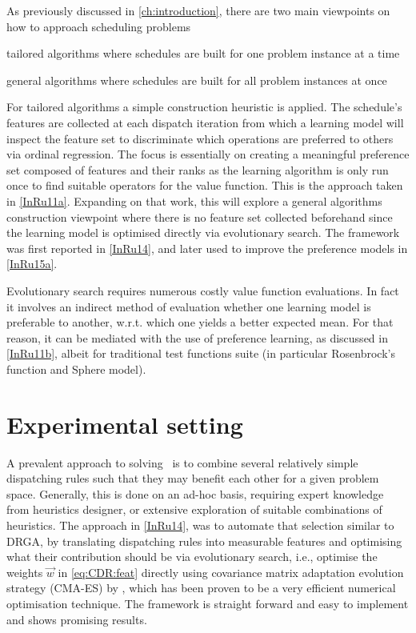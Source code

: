 As previously discussed in \cref{ch:introduction}, there are two main 
viewpoints on how to approach scheduling problems
\begin{enumerate*}
    \item tailored algorithms where schedules are built for one problem 
    instance at a time
    \item general algorithms where schedules are built for all problem 
    instances at once
\end{enumerate*}
For tailored algorithms a simple construction heuristic is applied. The 
schedule's features are collected at each dispatch iteration from which a 
learning model will inspect the feature set to discriminate which operations 
are preferred to others via ordinal regression. The focus is essentially on 
creating a meaningful preference set composed of features and their ranks as 
the learning algorithm is only run once to find suitable operators for the 
value function. This is the approach taken in \cref{InRu11a}. Expanding on 
that  work, this  will explore a general algorithms 
construction viewpoint where there is no feature set collected beforehand since 
the learning model is optimised directly via evolutionary search. The framework 
was first reported in \cref{InRu14}, and later used to improve the preference 
models in \cref{InRu15a}. 

Evolutionary search requires numerous costly value function evaluations. 
In fact it involves an indirect method of evaluation whether one learning model 
is preferable to another, w.r.t. which one yields a better expected mean. For 
that reason, it can be mediated with the use of preference learning, as 
discussed in \cref{InRu11b}, albeit for traditional test functions suite (in 
particular Rosenbrock's function and Sphere model).

\section{Experimental setting}
A prevalent approach to solving \JSP\ is to combine several relatively simple 
dispatching rules such that they may benefit each other for a given problem 
space. Generally, this is done on an ad-hoc basis, requiring expert knowledge 
from heuristics designer, or extensive exploration of suitable combinations of 
heuristics. The approach in \cref{InRu14}, was to automate that selection 
similar to DRGA, by translating dispatching rules into measurable features and 
optimising what their contribution should be via evolutionary search, i.e., 
optimise the weights $\vec{w}$ in \cref{eq:CDR:feat} directly using
covariance matrix adaptation evolution strategy (CMA-ES) by \cite{Hansen01}, 
which has been proven to be a very efficient numerical optimisation technique. 
The framework is straight forward and easy to implement and shows promising 
results. 


